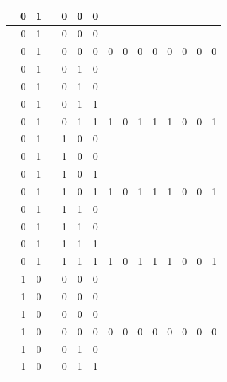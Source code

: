 \begin{table}[!tb]
\begin{tabular}{|c|c|c|c|c|c|c|c|c|c|c|c|c|c|c|}
        \rowcolor{yellow!40}  & 0 & 1 &  & 0 & 0 & 0 &  &  &  &  &  &  &  &  \\ \hline
        \rowcolor{yellow!40}  & 0 & 1 &  & 0 & 0 & 0 &  &  &  &  &  &  &  &  \\ \hline
        \rowcolor{yellow!40}  & 0 & 1 &  & 0 & 0 & 0 & 0 & 0 & 0 & 0 & 0 & 0 & 0 & 0 \\ \hline
        \rowcolor{gray!40}  & 0 & 1 &  & 0 & 1 & 0 &  &  &  &  &  &  &  &  \\ \hline
        \rowcolor{gray!40}  & 0 & 1 &  & 0 & 1 & 0 &  &  &  &  &  &  &  &  \\ \hline
        \rowcolor{gray!40}  & 0 & 1 &  & 0 & 1 & 1 &  &  &  &  &  &  &  &  \\ \hline
        \rowcolor{gray!40}  & 0 & 1 &  & 0 & 1 & 1 & 1 & 0 & 1 & 1 & 1 & 0 & 0 & 1 \\ \hline
        \rowcolor{blue!40}  & 0 & 1 &  & 1 & 0 & 0 &  &  &  &  &  &  &  &  \\ \hline
        \rowcolor{blue!40}  & 0 & 1 &  & 1 & 0 & 0 &  &  &  &  &  &  &  &  \\ \hline
        \rowcolor{blue!40}  & 0 & 1 &  & 1 & 0 & 1 &  &  &  &  &  &  &  &  \\ \hline
        \rowcolor{blue!40}  & 0 & 1 &  & 1 & 0 & 1 & 1 & 0 & 1 & 1 & 1 & 0 & 0 & 1 \\ \hline
        \rowcolor{red!40}  & 0 & 1 &  & 1 & 1 & 0 &  &  &  &  &  &  &  &  \\ \hline
        \rowcolor{red!40}  & 0 & 1 &  & 1 & 1 & 0 &  &  &  &  &  &  &  &  \\ \hline
        \rowcolor{red!40}  & 0 & 1 &  & 1 & 1 & 1 &  &  &  &  &  &  &  &  \\ \hline
        \rowcolor{red!40}  & 0 & 1 &  & 1 & 1 & 1 & 1 & 0 & 1 & 1 & 1 & 0 & 0 & 1 \\ \hline
        \rowcolor{green!40}  & 1 & 0 &  & 0 & 0 & 0 &  &  &  &  &  &  &  &  \\ \hline
        \rowcolor{green!40}  & 1 & 0 &  & 0 & 0 & 0 &  &  &  &  &  &  &  &  \\ \hline
        \rowcolor{green!40}  & 1 & 0 &  & 0 & 0 & 0 &  &  &  &  &  &  &  &  \\ \hline
        \rowcolor{green!40}  & 1 & 0 &  & 0 & 0 & 0 & 0 & 0 & 0 & 0 & 0 & 0 & 0 & 0 \\ \hline
        \rowcolor{yellow!40}  & 1 & 0 &  & 0 & 1 & 0 &  &  &  &  &  &  &  &  \\ \hline
        \rowcolor{yellow!40}  & 1 & 0 &  & 0 & 1 & 1 &  &  &  &  &  &  &  &  \\ \hline

\end{tabular}
\end{table}
